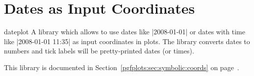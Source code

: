 \section{Dates as Input Coordinates}
\begin{pgfplotslibrary}{dateplot}
	A library which allows to use dates like |2008-01-01| or dates with time like |2008-01-01 11:35| as input coordinates in plots. The library converts dates to numbers and tick labels will be pretty-printed dates (or times).

	This library is documented in Section~\ref{pgfplots:sec:symbolic:coords} on page~\pageref{pgfplots:sec:date:coords}.
\end{pgfplotslibrary}

